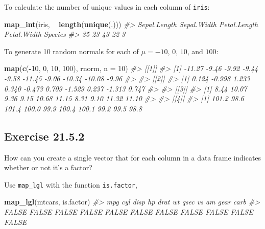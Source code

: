 \documentclass[]{book}
\newenvironment{Shaded}{\begin{snugshade}}{\end{snugshade}}
\newcommand{\CommentTok}[1]{\textcolor[rgb]{0.56,0.35,0.01}{\textit{#1}}}
\newcommand{\DataTypeTok}[1]{\textcolor[rgb]{0.13,0.29,0.53}{#1}}
\newcommand{\DecValTok}[1]{\textcolor[rgb]{0.00,0.00,0.81}{#1}}
\newcommand{\KeywordTok}[1]{\textcolor[rgb]{0.13,0.29,0.53}{\textbf{#1}}}
\newcommand{\NormalTok}[1]{#1}
\newcommand{\OperatorTok}[1]{\textcolor[rgb]{0.81,0.36,0.00}{\textbf{#1}}}
\newcommand{\StringTok}[1]{\textcolor[rgb]{0.31,0.60,0.02}{#1}}
\theoremstyle{plain}
\theoremstyle{remark}
\begin{document}
To calculate the number of unique values in each column of
\texttt{iris}:

\begin{Shaded}
\begin{Highlighting}[]
\KeywordTok{map_int}\NormalTok{(iris, }\OperatorTok{~}\StringTok{ }\KeywordTok{length}\NormalTok{(}\KeywordTok{unique}\NormalTok{(.)))}
\CommentTok{#> Sepal.Length  Sepal.Width Petal.Length  Petal.Width      Species }
\CommentTok{#>           35           23           43           22            3}
\end{Highlighting}
\end{Shaded}

To generate 10 random normals for each of \(\mu = -10\), \(0\), \(10\),
and \(100\):

\begin{Shaded}
\begin{Highlighting}[]
\KeywordTok{map}\NormalTok{(}\KeywordTok{c}\NormalTok{(}\OperatorTok{-}\DecValTok{10}\NormalTok{, }\DecValTok{0}\NormalTok{, }\DecValTok{10}\NormalTok{, }\DecValTok{100}\NormalTok{), rnorm, }\DataTypeTok{n =} \DecValTok{10}\NormalTok{)}
\CommentTok{#> [[1]]}
\CommentTok{#>  [1] -11.27  -9.46  -9.92  -9.44  -9.58 -11.45  -9.06 -10.34 -10.08  -9.96}
\CommentTok{#> }
\CommentTok{#> [[2]]}
\CommentTok{#>  [1]  0.124 -0.998  1.233  0.340 -0.473  0.709 -1.529  0.237 -1.313  0.747}
\CommentTok{#> }
\CommentTok{#> [[3]]}
\CommentTok{#>  [1]  8.44 10.07  9.36  9.15 10.68 11.15  8.31  9.10 11.32 11.10}
\CommentTok{#> }
\CommentTok{#> [[4]]}
\CommentTok{#>  [1] 101.2  98.6 101.4 100.0  99.9 100.4 100.1  99.2  99.5  98.8}
\end{Highlighting}
\end{Shaded}

\hypertarget{exercise-21.5.2}{%
\subsection*{\texorpdfstring{Exercise
{21.5.2}}{Exercise 21.5.2}}\label{exercise-21.5.2}}

How can you create a single vector that for each column in a data frame
indicates whether or not it's a factor?

Use \texttt{map\_lgl} with the function \texttt{is.factor},

\begin{Shaded}
\begin{Highlighting}[]
\KeywordTok{map_lgl}\NormalTok{(mtcars, is.factor)}
\CommentTok{#>   mpg   cyl  disp    hp  drat    wt  qsec    vs    am  gear  carb }
\CommentTok{#> FALSE FALSE FALSE FALSE FALSE FALSE FALSE FALSE FALSE FALSE FALSE}
\end{Highlighting}
\end{Shaded}
\end{document}
